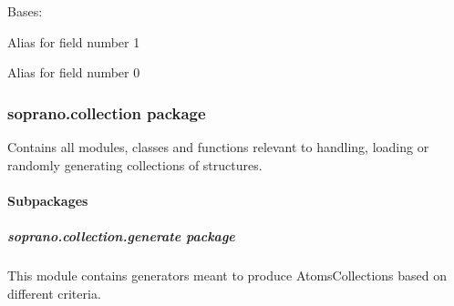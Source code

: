 \documentclass[letterpaper,10pt,english]{sphinxmanual}
\begin{document}

\begin{fulllineitems}
\label{doctree/soprano.calculate.xrd.xrd:soprano.calculate.xrd.xrd.XraySpectrumData}
Bases: 

\begin{fulllineitems}
\label{doctree/soprano.calculate.xrd.xrd:soprano.calculate.xrd.xrd.XraySpectrumData.intensity}
Alias for field number 1

\end{fulllineitems}


\begin{fulllineitems}
\label{doctree/soprano.calculate.xrd.xrd:soprano.calculate.xrd.xrd.XraySpectrumData.theta2}
Alias for field number 0

\end{fulllineitems}


\end{fulllineitems}



\subsubsection{soprano.collection package}
\label{doctree/soprano.collection:soprano-collection-package}\label{doctree/soprano.collection::doc}\label{doctree/soprano.collection:module-soprano.collection}
Contains all modules, classes and functions relevant
to handling, loading or randomly generating
collections of structures.


\paragraph{Subpackages}
\label{doctree/soprano.collection:subpackages}

\subparagraph{soprano.collection.generate package}
\label{doctree/soprano.collection.generate:module-soprano.collection.generate}\label{doctree/soprano.collection.generate:soprano-collection-generate-package}\label{doctree/soprano.collection.generate::doc}
This module contains generators meant to produce AtomsCollections based
on different criteria.
\end{document}
